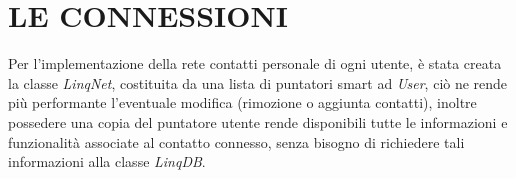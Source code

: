 \section*{LE CONNESSIONI}
Per l'implementazione della rete contatti personale di ogni utente, è stata creata la classe \textit{LinqNet}, costituita da una lista di puntatori smart ad \textit{User},
ciò ne rende più performante l'eventuale modifica (rimozione o aggiunta contatti), inoltre possedere una copia del puntatore utente rende disponibili tutte le informazioni e
funzionalità associate al contatto connesso, senza bisogno di richiedere tali informazioni alla classe \textit{LinqDB}.